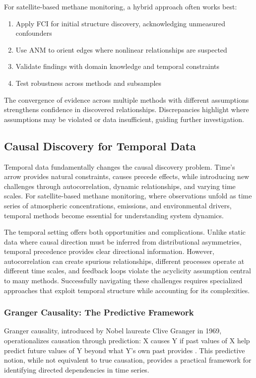 For satellite-based methane monitoring, a hybrid approach often works best:
\begin{enumerate}
\item Apply FCI for initial structure discovery, acknowledging unmeasured confounders
\item Use ANM to orient edges where nonlinear relationships are suspected
\item Validate findings with domain knowledge and temporal constraints
\item Test robustness across methods and subsamples
\end{enumerate}

The convergence of evidence across multiple methods with different assumptions strengthens confidence in discovered relationships. Discrepancies highlight where assumptions may be violated or data insufficient, guiding further investigation.

\subsection{Causal Discovery for Temporal Data}
\label{subsec:temporal_causal}

Temporal data fundamentally changes the causal discovery problem. Time's arrow provides natural constraints, causes precede effects, while introducing new challenges through autocorrelation, dynamic relationships, and varying time scales. For satellite-based methane monitoring, where observations unfold as time series of atmospheric concentrations, emissions, and environmental drivers, temporal methods become essential for understanding system dynamics.

The temporal setting offers both opportunities and complications. Unlike static data where causal direction must be inferred from distributional asymmetries, temporal precedence provides clear directional information. However, autocorrelation can create spurious relationships, different processes operate at different time scales, and feedback loops violate the acyclicity assumption central to many methods. Successfully navigating these challenges requires specialized approaches that exploit temporal structure while accounting for its complexities.

\subsubsection{Granger Causality: The Predictive Framework}

Granger causality, introduced by Nobel laureate Clive Granger in 1969, operationalizes causation through prediction: X causes Y if past values of X help predict future values of Y beyond what Y's own past provides \cite{Granger}. This predictive notion, while not equivalent to true causation, provides a practical framework for identifying directed dependencies in time series.

